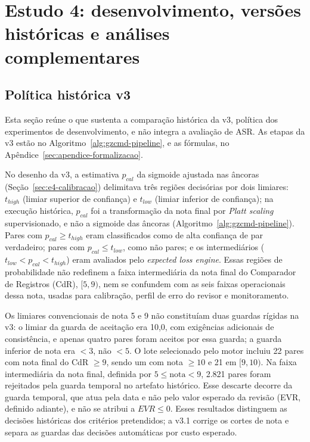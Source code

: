\chapter{Estudo 4: desenvolvimento, versões históricas e análises complementares}\label{ap:gzcmd}

\section{Política histórica v3}\label{sec:e4-ap-historico}

Esta seção reúne o que sustenta a comparação histórica da v3, política dos experimentos de desenvolvimento, e não integra a avaliação de ASR. As etapas da v3 estão no Algoritmo~\ref{alg:gzcmd-pipeline}, e as fórmulas, no Apêndice~\ref{sec:apendice-formalizacao}.

No desenho da v3, a estimativa $p_{cal}$ da sigmoide ajustada nas âncoras (Seção~\ref{sec:e4-calibracao}) delimitava três regiões decisórias por dois limiares: $t_{high}$ (limiar superior de confiança) e $t_{low}$ (limiar inferior de confiança); na execução histórica, $p_{cal}$ foi a transformação da nota final por \textit{Platt scaling} supervisionado, e não a sigmoide das âncoras (Algoritmo~\ref{alg:gzcmd-pipeline}). Pares com $p_{cal}\geq t_{high}$ eram classificados como de alta confiança de par verdadeiro; pares com $p_{cal}\leq t_{low}$, como não pares; e os intermediários ($t_{low}<p_{cal}<t_{high}$) eram avaliados pelo \textit{expected loss engine}. Essas regiões de probabilidade não redefinem a faixa intermediária da nota final do Comparador de Registros (CdR), $[5,9)$, nem se confundem com as seis faixas operacionais dessa nota, usadas para calibração, perfil de erro do revisor e monitoramento.

Os limiares convencionais de nota 5 e 9 não constituíam duas guardas rígidas na v3: o limiar da guarda de aceitação era 10,0, com exigências adicionais de consistência, e apenas quatro pares foram aceitos por essa guarda; a guarda inferior de nota era $<3$, não $<5$. O lote selecionado pelo motor incluiu 22 pares com nota final do CdR $\geq9$, sendo um com nota $\geq10$ e 21 em $[9,10)$. Na faixa intermediária da nota final, definida por $5\leq\text{nota}<9$, 2.821 pares foram rejeitados pela guarda temporal no artefato histórico. Esse descarte decorre da guarda temporal, que atua pela data e não pelo valor esperado da revisão (EVR, definido adiante), e não se atribui a $EVR\leq0$. Esses resultados distinguem as decisões históricas dos critérios pretendidos; a v3.1 corrige os cortes de nota e separa as guardas das decisões automáticas por custo esperado.

